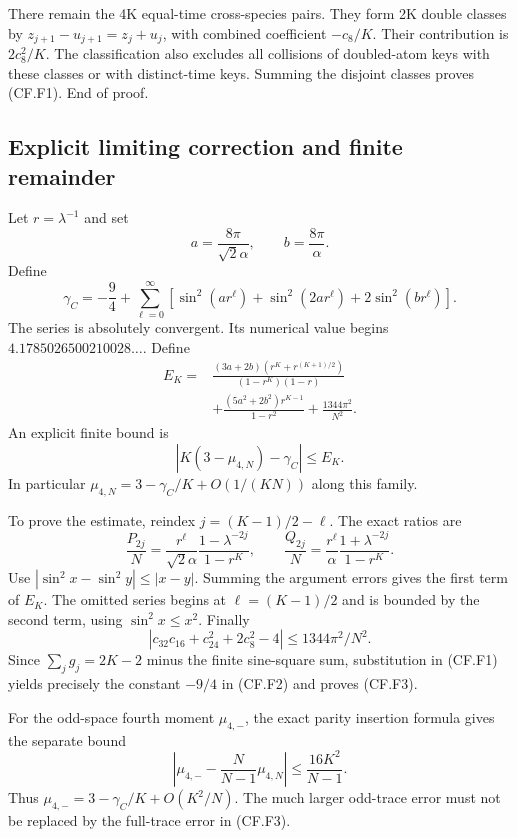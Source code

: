 There remain the 4K equal-time cross-species pairs. They form 2K double classes by \(z_{j+1}-u_{j+1}=z_j+u_j\), with combined coefficient \(-c_8/K\). Their contribution is \(2c_8^2/K\). The classification also excludes all collisions of doubled-atom keys with these classes or with distinct-time keys. Summing the disjoint classes proves (CF.F1). End of proof.

\subsection{Explicit limiting correction and finite remainder}\label{cobfourth:explicit-limiting-correction-and-finite-remainder}

Let \(r=\lambda^{-1}\) and set \[
 a=\frac{8\pi}{\sqrt2\alpha},\qquad b=\frac{8\pi}{\alpha}.
\] Define \[
 \gamma_C=-\frac94+\sum_{\ell=0}^{\infty}
 [\sin^2(ar^\ell)+\sin^2(2ar^\ell)+2\sin^2(br^\ell)].          \tag{CF.F2}
\] The series is absolutely convergent. Its numerical value begins \(4.1785026500210028\ldots\). Define \[
 \begin{split}
 E_K={}&\frac{(3a+2b)(r^K+r^{(K+1)/2})}{(1-r^K)(1-r)}\\
      &+\frac{(5a^2+2b^2)r^{K-1}}{1-r^2}
       +\frac{1344\pi^2}{N^2}.
 \end{split}
\] An explicit finite bound is \[
 |K(3-\mu_{4,N})-\gamma_C|\leq E_K.                            \tag{CF.F3}
\] In particular \(\mu_{4,N}=3-\gamma_C/K+O(1/(KN))\) along this family.

To prove the estimate, reindex \(j=(K-1)/2-\ell\). The exact ratios are \[
 \frac{P_{2j}}N=\frac{r^\ell}{\sqrt2\alpha}
                  \frac{1-\lambda^{-2j}}{1-r^K},\qquad
 \frac{Q_{2j}}N=\frac{r^\ell}{\alpha}
                  \frac{1+\lambda^{-2j}}{1-r^K}.
\] Use \(|\sin^2x-\sin^2y|\leq|x-y|\). Summing the argument errors gives the first term of \(E_K\). The omitted series begins at \(\ell=(K-1)/2\) and is bounded by the second term, using \(\sin^2x\leq x^2\). Finally \[
 |c_{32}c_{16}+c_{24}^2+2c_8^2-4|\leq1344\pi^2/N^2.
\] Since \(\sum_jg_j=2K-2\) minus the finite sine-square sum, substitution in (CF.F1) yields precisely the constant \(-9/4\) in (CF.F2) and proves (CF.F3).

For the odd-space fourth moment \(\mu_{4,-}\), the exact parity insertion formula gives the separate bound \[
 \left|\mu_{4,-}-\frac{N}{N-1}\mu_{4,N}\right|
                                      \leq\frac{16K^2}{N-1}.    \tag{CF.F4}
\] Thus \(\mu_{4,-}=3-\gamma_C/K+O(K^2/N)\). The much larger odd-trace error must not be replaced by the full-trace error in (CF.F3).
